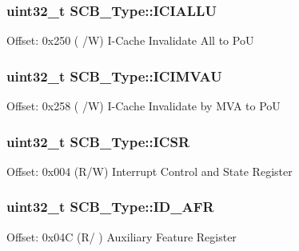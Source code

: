\subsubsection[{\texorpdfstring{I\+C\+I\+A\+L\+LU}{ICIALLU}}]{ uint32\+\_\+t S\+C\+B\+\_\+\+Type\+::\+I\+C\+I\+A\+L\+LU}\hypertarget{struct_s_c_b___type_ad323c3f1f75c8f6971214146a566dc8c}{}\label{struct_s_c_b___type_ad323c3f1f75c8f6971214146a566dc8c}
Offset\+: 0x250 ( /W) I-\/\+Cache Invalidate All to PoU 
\subsubsection[{\texorpdfstring{I\+C\+I\+M\+V\+AU}{ICIMVAU}}]{ uint32\+\_\+t S\+C\+B\+\_\+\+Type\+::\+I\+C\+I\+M\+V\+AU}\hypertarget{struct_s_c_b___type_a86c0feeceb540651e6ca01af397e7c9c}{}\label{struct_s_c_b___type_a86c0feeceb540651e6ca01af397e7c9c}
Offset\+: 0x258 ( /W) I-\/\+Cache Invalidate by M\+VA to PoU 
\subsubsection[{\texorpdfstring{I\+C\+SR}{ICSR}}]{ uint32\+\_\+t S\+C\+B\+\_\+\+Type\+::\+I\+C\+SR}\hypertarget{struct_s_c_b___type_a3e66570ab689d28aebefa7e84e85dc4a}{}\label{struct_s_c_b___type_a3e66570ab689d28aebefa7e84e85dc4a}
Offset\+: 0x004 (R/W) Interrupt Control and State Register 
\subsubsection[{\texorpdfstring{I\+D\+\_\+\+A\+FR}{ID_AFR}}]{ uint32\+\_\+t S\+C\+B\+\_\+\+Type\+::\+I\+D\+\_\+\+A\+FR}\hypertarget{struct_s_c_b___type_acb57cbc70338c6acc607ec6b241a848c}{}\label{struct_s_c_b___type_acb57cbc70338c6acc607ec6b241a848c}
Offset\+: 0x04C (R/ ) Auxiliary Feature Register 
